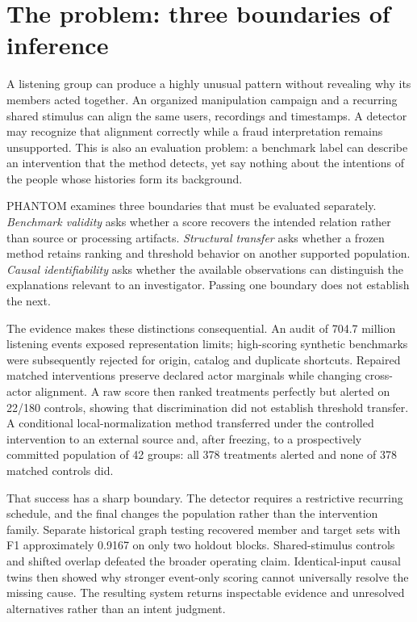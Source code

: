 \documentclass[11pt,letterpaper]{article}
\begin{document}
\section{The problem: three boundaries of inference}
A listening group can produce a highly unusual pattern without revealing why its members acted together. An organized manipulation campaign and a recurring shared stimulus can align the same users, recordings and timestamps. A detector may recognize that alignment correctly while a fraud interpretation remains unsupported. This is also an evaluation problem: a benchmark label can describe an intervention that the method detects, yet say nothing about the intentions of the people whose histories form its background.

PHANTOM examines three boundaries that must be evaluated separately. \emph{Benchmark validity} asks whether a score recovers the intended relation rather than source or processing artifacts. \emph{Structural transfer} asks whether a frozen method retains ranking and threshold behavior on another supported population. \emph{Causal identifiability} asks whether the available observations can distinguish the explanations relevant to an investigator. Passing one boundary does not establish the next.

The evidence makes these distinctions consequential. An audit of 704.7 million listening events exposed representation limits; high-scoring synthetic benchmarks were subsequently rejected for origin, catalog and duplicate shortcuts. Repaired matched interventions preserve declared actor marginals while changing cross-actor alignment. A raw score then ranked treatments perfectly but alerted on 22/180 controls, showing that discrimination did not establish threshold transfer. A conditional local-normalization method transferred under the controlled intervention to an external source and, after freezing, to a prospectively committed population of 42 groups: all 378 treatments alerted and none of 378 matched controls did.

That success has a sharp boundary. The detector requires a restrictive recurring schedule, and the final changes the population rather than the intervention family. Separate historical graph testing recovered member and target sets with F1 approximately 0.9167 on only two holdout blocks. Shared-stimulus controls and shifted overlap defeated the broader operating claim. Identical-input causal twins then showed why stronger event-only scoring cannot universally resolve the missing cause. The resulting system returns inspectable evidence and unresolved alternatives rather than an intent judgment.
\end{document}
